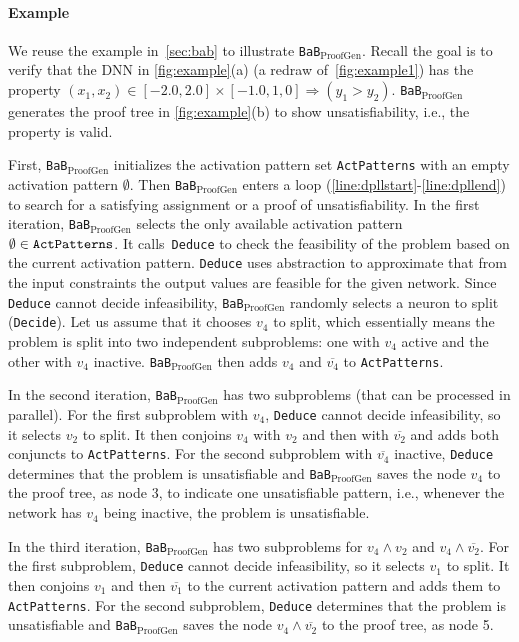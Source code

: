 \documentclass[oneside,11pt,dvipsnames]{book}
\newcommand{\functiontextformat}[1]{\textrm{\texttt{#1}}}
\newcommand{\proofgen}{\texttt{BaB$_{\text{ProofGen}}$}}
\begin{document}
\paragraph{Example} We reuse the example in~\autoref{sec:bab} to illustrate \proofgen{}. Recall the goal is to verify that the DNN in \autoref{fig:example}(a) (a redraw of~\autoref{fig:example1}) has the property $(x_1, x_2) \in [-2.0, 2.0] \times [-1.0, 1,0] \Rightarrow (y_1 > y_2)$. \proofgen{} generates the proof tree in \autoref{fig:example}(b) to show unsatisfiability, i.e., the property is valid.

First, \proofgen{} initializes the activation pattern set \functiontextformat{ActPatterns} with an empty activation pattern $\emptyset$. Then \proofgen{} enters a loop (\autoref{line:dpllstart}-\autoref{line:dpllend}) to search for a satisfying assignment or a proof of unsatisfiability. In the first iteration, \proofgen{} selects the only available activation pattern $\emptyset \in \functiontextformat{ActPatterns}$. 
It calls~\functiontextformat{Deduce} to check the feasibility of the problem based on the current activation pattern. \functiontextformat{Deduce} uses abstraction to approximate that from the input constraints the output values are feasible for the given network. 
Since \functiontextformat{Deduce} cannot decide infeasibility, \proofgen{} randomly selects a neuron to split (\functiontextformat{Decide}). Let us assume that it chooses $v_4$ to split, which essentially means the problem is split into two independent subproblems: one with $v_4$ active and the other with $v_4$ inactive.
\proofgen{} then adds $v_4$ and $\overline{v_4}$ to \functiontextformat{ActPatterns}.

In the second iteration, \proofgen{} has two subproblems (that can be processed in parallel). For the first subproblem with $v_4$, \functiontextformat{Deduce} cannot decide infeasibility, so it selects $v_2$ to split. It then conjoins $v_4$ with $v_2$ and then with $\overline{v_2}$ and adds both conjuncts to \texttt{ActPatterns}. 
For the second subproblem with $\overline{v_4}$ inactive, \functiontextformat{Deduce} determines that the problem is unsatisfiable and \proofgen{} saves the node $v_4$ to the proof tree, as node 3, to indicate one unsatisfiable pattern, i.e., whenever the network has $v_4$ being inactive, the problem is unsatisfiable.

In the third iteration, \proofgen{} has two subproblems for $v_4 \land v_2$ and $v_4 \land \overline{v_2}$. For the first subproblem, \functiontextformat{Deduce} cannot decide infeasibility, so it selects $v_1$ to split. It then conjoins $v_1$ and then $\overline{v_1}$ to the current activation pattern and adds them to \functiontextformat{ActPatterns}. For the second subproblem, \functiontextformat{Deduce} determines that the problem is unsatisfiable and \proofgen{} saves the node $v_4 \land \overline{v_2}$ to the proof tree, as node 5.
\end{document}
